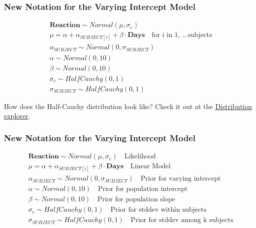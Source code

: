 \documentclass{beamer}
\begin{document}
\begin{frame}
    \frametitle{New Notation for the Varying Intercept Model}
    \large
    \begin{align*}
        &\mathbf{Reaction} \sim Normal(\mu, \sigma_{e}) \\
        &\mu = \alpha + \alpha_{SUBJECT[i]} + \beta \cdot \mathbf{Days} \quad \text{for i in 1, ...subjects}\\
        &\alpha_{SUBJECT} \sim Normal(0, \sigma_{SUBJECT}) \\
        &\alpha \sim Normal(0, 10) \\
        &\beta \sim Normal(0, 10) \\
        &\sigma_{e} \sim HalfCauchy(0,1) \\
        &\sigma_{SUBJECT} \sim HalfCauchy(0,1)
    \end{align*}

    \vspace{1cm}
    How does the Half-Cauchy distribution look like? Check it out at the \href{https://distribution-explorer.github.io/continuous/halfcauchy.html}{Distribution explorer}.
\end{frame}

\begin{frame}
    \frametitle{New Notation for the Varying Intercept Model}
    \large
    \begin{align*}
        & \mathbf{Reaction} \sim Normal(\mu, \sigma_{e}) \quad \text{Likelihood}\\
        & \mu = \alpha + \alpha_{SUBJECT[i]} + \beta \cdot \mathbf{Days} \quad \text{Linear Model}\\
        & \alpha_{SUBJECT} \sim Normal(0, \sigma_{SUBJECT}) \quad \text{Prior for varying intercept}\\
        & \alpha \sim Normal(0, 10) \quad \text{Prior for population intercept}\\
        & \beta \sim Normal(0, 10) \quad \text{Prior for population slope}\\
        & \sigma_{e} \sim HalfCauchy(0,1) \quad \text{Prior for stddev within subjects}\\
        & \sigma_{SUBJECT} \sim HalfCauchy(0,1) \quad \text{Prior for stddev among k subjects}
    \end{align*}
\end{frame}
\end{document}
